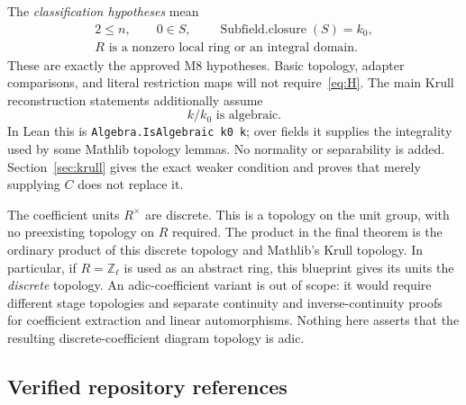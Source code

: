 \documentclass[11pt]{article}
\theoremstyle{remark}\newtheorem{remark}[theorem]{Remark}
\newcommand{\Z}{\mathbb Z}
\begin{document}
The \emph{classification hypotheses} mean
\[
 \begin{gathered}
  2\leq n,\qquad 0\in S,\qquad \operatorname{Subfield.closure}(S)=k_0,\\
  R\text{ is a nonzero local ring or an integral domain}.
 \end{gathered}
\tag{H}\label{eq:H}
\]
These are exactly the approved M8 hypotheses. Basic topology, adapter
comparisons, and literal restriction maps will not require~\eqref{eq:H}.
The main Krull reconstruction statements additionally assume
\[
                     k/k_0\text{ is algebraic}.                 \tag{A}\label{eq:A}
\]
In Lean this is \texttt{Algebra.IsAlgebraic k0 k}; over fields it supplies
the integrality used by some Mathlib topology lemmas. No normality or
separability is added. Section~\ref{sec:krull} gives the exact weaker
condition and proves that merely supplying $C$ does not replace it.

The coefficient units $R^\times$ are discrete. This is a topology on the
unit group, with no preexisting topology on $R$ required. The product in
the final theorem is the ordinary product of this discrete topology
and Mathlib's Krull topology. In particular, if $R=\Z_\ell$ is used as
an abstract ring, this blueprint gives its units the \emph{discrete}
topology. An adic-coefficient variant is out of scope: it would require
different stage topologies and separate continuity and inverse-continuity
proofs for coefficient extraction and linear automorphisms. Nothing here
asserts that the resulting discrete-coefficient diagram topology is adic.

\subsection{Verified repository references}
\end{document}
